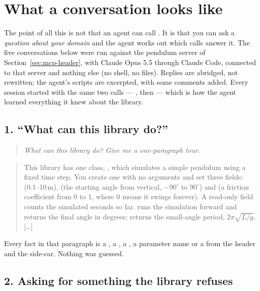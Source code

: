 \section{What a conversation looks like}
\label{sec:mcp-chats}

The point of all this is not that an agent can call . It is
that you can ask a \emph{question about your domain} and the agent works out
which calls answer it. The five conversations below were run against the
pendulum server of Section~\ref{sec:mcp-header}, with Claude Opus 5.5 through
Claude Code, connected to that server and nothing else (no shell, no files).
Replies are abridged, not rewritten; the agent's scripts are excerpted, with
some comments added. Every session started with the same two calls ---
, then  --- which is how the agent
learned everything it knew about the library.

\subsection*{1. ``What can this library do?''}

\begin{quote}
\small\itshape
What can this library do? Give me a one-paragraph tour.
\end{quote}

\begin{quote}
\small
This library has one class, , which simulates a simple
pendulum using a fixed time step. You create one with no arguments and set three
fields:  (0.1--10\,m),  (the starting angle from
vertical, $-90^\circ$ to $90^\circ$) and  (a friction coefficient
from 0 to 1, where 0 means it swings forever). A read-only  field
counts the simulated seconds so far.  runs the
simulation forward and returns the final angle in degrees; 
returns the small-angle period, $2\pi\sqrt{L/g}$. [\ldots]
\end{quote}

Every fact in that paragraph is a , a , a
, a parameter name or a  from the header and the
side-car. Nothing was guessed.

\subsection*{2. Asking for something the library refuses}

